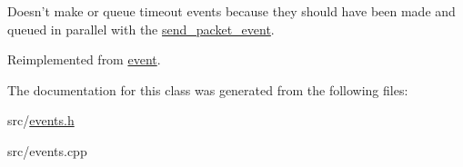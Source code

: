 Doesn't make or queue timeout events because they should have been made and queued in parallel with the \hyperlink{classsend__packet__event}{send\-\_\-packet\-\_\-event}. 

Reimplemented from \hyperlink{classevent_a74b7b9e3b4dd30fb42a2612968def7ef}{event}.



The documentation for this class was generated from the following files\-:\begin{DoxyCompactItemize}
\item 
src/\hyperlink{events_8h}{events.\-h}\item 
src/events.\-cpp\end{DoxyCompactItemize}
